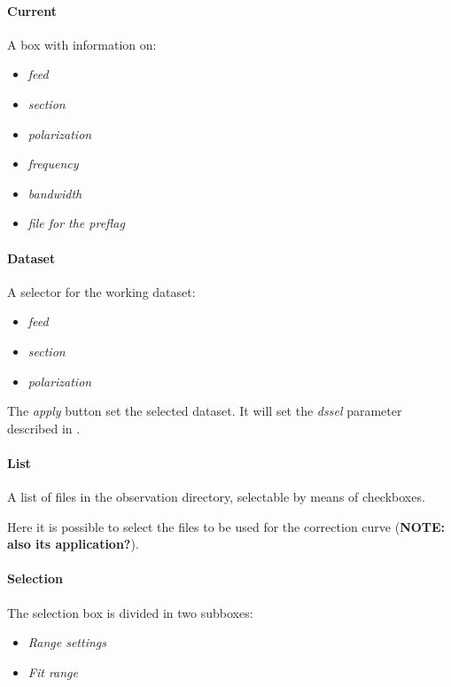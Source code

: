 \documentclass[letterpaper,10pt,english]{sphinxmanual}
\begin{document}
\paragraph{Current}
\label{guibp:current}
A box with information on:
\begin{itemize}
\item {} 
\emph{feed}

\item {} 
\emph{section}

\item {} 
\emph{polarization}

\item {} 
\emph{frequency}

\item {} 
\emph{bandwidth}

\item {} 
\emph{file for the preflag}

\end{itemize}


\paragraph{Dataset}
\label{guibp:dataset}
A selector for the working dataset:
\begin{itemize}
\item {} 
\emph{feed}

\item {} 
\emph{section}

\item {} 
\emph{polarization}

\end{itemize}

The \emph{apply} button set the selected dataset. It will set the \emph{dssel} parameter described in {\hyperref[tuibp::doc]{}}.


\paragraph{List}
\label{guibp:list}
A list of files in the observation directory, selectable by means of checkboxes.

Here it is possible to select the files to be used for the correction curve
(\textbf{NOTE: also its application?}).


\paragraph{Selection}
\label{guibp:selection}
The selection box is divided in two subboxes:
\begin{itemize}
\item {} 
\emph{Range settings}

\item {} 
\emph{Fit range}

\end{itemize}
\end{document}
